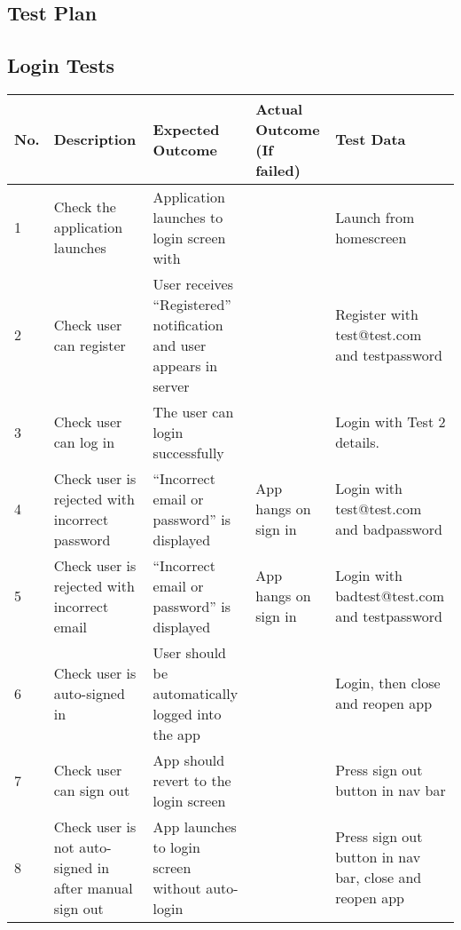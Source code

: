 \begin{landscape}
\chapter{Test Plan}

\section{Login Tests}
\begin{tabularx}{\linewidth}{p{1cm} X X X X}
\textbf{No.} & \textbf{Description}                    & \textbf{Expected Outcome}                                  & \textbf{Actual Outcome (If failed)} & \textbf{Test Data}                                          \\ \hline
1   & Check the application launches                         & Application launches to login screen with                          &                            & Launch from homescreen                                 \\ \hline
2   & Check user can register                                & User receives ``Registered'' notification and user appears in server &                            & Register with test@test.com and testpassword           \\ \hline
3   & Check user can log in                                  & The user can login successfully                                    &                            & Login with Test 2 details.                             \\ \hline
4   & Check user is rejected with incorrect password         & ``Incorrect email or password'' is displayed                         & App hangs on sign in       & Login with test@test.com and badpassword               \\ \hline
5   & Check user is rejected with incorrect email            & ``Incorrect email or password'' is displayed                         & App hangs on sign in       & Login with badtest@test.com and testpassword           \\ \hline
6   & Check user is auto-signed in                           & User should be automatically logged into the app                   &                            & Login, then close and reopen app                       \\ \hline
7   & Check user can sign out                                & App should revert to the login screen                              &                            & Press sign out button in nav bar                       \\ \hline
8   & Check user is not auto-signed in after manual sign out & App launches to login screen without auto-login                    &                            & Press sign out button in nav bar, close and reopen app \\ \hline
\end{tabularx} 


\end{landscape}
